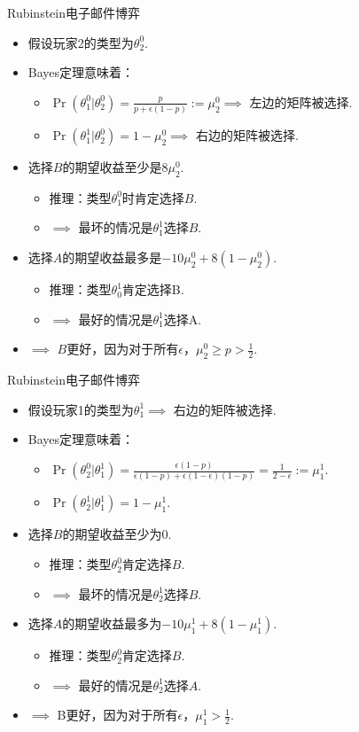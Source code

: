 {Rubinstein电子邮件博弈}
\begin{itemize}
\item 假设玩家2的类型为$\theta_2^0$.
\item Bayes定理意味着：
\begin{itemize}
\item $\Pr(\theta_1^0|\theta_2^0) = \frac{p}{p+\epsilon(1-p)} := \mu_2^0\implies$  左边的矩阵被选择. 
\item $\Pr(\theta_1^1|\theta_2^0) = 1 - \mu_2^0\implies$ 右边的矩阵被选择. 
\end{itemize}
\item 选择$B$的期望收益至少是$8\mu_2^0$.
\begin{itemize}
\item 推理：类型$\theta_1^0$时肯定选择$B$.
\item $\implies$ 最坏的情况是$\theta_1^1$选择$B$.
\end{itemize}
\item 选择$A$的期望收益最多是$-10\mu_2^0 + 8(1 - \mu_2^0)$. 
\begin{itemize}
\item 推理：类型$\theta_0^1$肯定选择B. 
\item $\implies$ 最好的情况是$\theta_1^1$选择A. 

\end{itemize}
\item $\implies$ $B$更好，因为对于所有$\epsilon$，$\mu_2^0 \geq p > \frac{1}{2}$.
\end{itemize}


{Rubinstein电子邮件博弈}
\begin{itemize}
\item 假设玩家1的类型为$\theta_1^1$$\implies$ 右边的矩阵被选择. 
\item Bayes定理意味着：
\begin{itemize}
    \item $\Pr(\theta_2^0|\theta_1^1) = \frac{\epsilon(1-p)}{\epsilon(1-p)+\epsilon(1-\epsilon)(1-p)} = \frac{1}{2-\epsilon} := \mu_1^1$. 
\item $\Pr(\theta_2^1|\theta_1^1) = 1 - \mu_1^1$. 
\end{itemize}
\item 选择$B$的期望收益至少为$0$. 
\begin{itemize}
    \item 推理：类型$\theta_2^0$肯定选择$B$. 
    \item $\implies$ 最坏的情况是$\theta_2^1$选择$B$. 
\end{itemize}
\item 选择$A$的期望收益最多为$-10\mu_1^1 + 8(1 - \mu_1^1)$. 
\begin{itemize}
    \item 推理：类型$\theta_2^0$肯定选择$B$. 
\item $\implies$ 最好的情况是$\theta_2^1$选择$A$. 
\end{itemize}
\item $\implies$ B更好，因为对于所有$\epsilon$，$\mu_1^1 > \frac{1}{2}$. 
\end{itemize}


